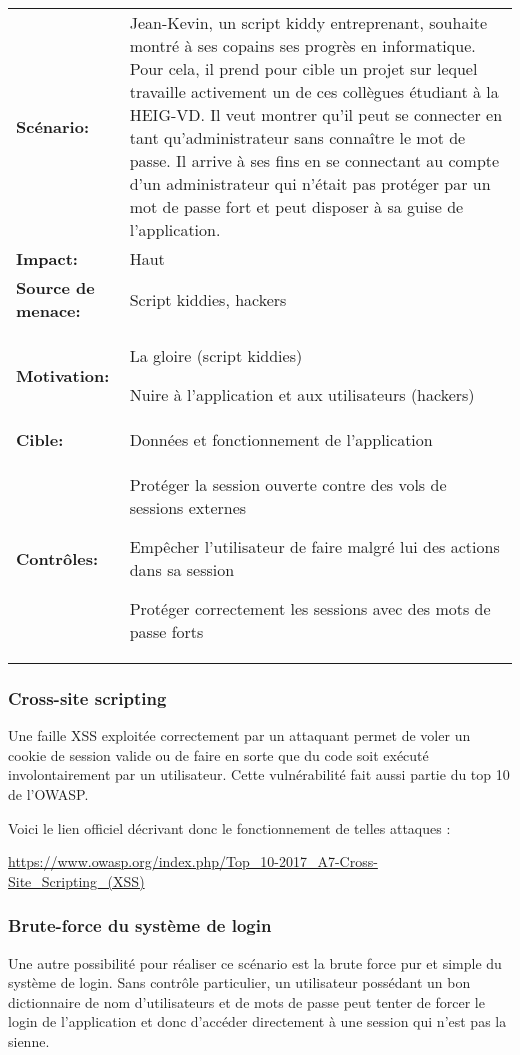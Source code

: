 \renewcommand{\arraystretch}{1.6}
\begin{tabular}{@{}p{4cm}p{12cm}}
\textbf{Scénario:} &  Jean-Kevin, un script kiddy entreprenant, souhaite montré à ses copains ses progrès en informatique. Pour cela, il prend pour cible un projet sur lequel travaille activement un de ces collègues étudiant à la HEIG-VD. Il veut montrer qu'il peut se connecter en tant qu'administrateur sans connaître le
mot de passe. Il arrive à ses fins en se connectant au compte d'un
administrateur qui n'était pas protéger par un mot de passe fort et
peut disposer à sa guise de l'application.\\
\textbf{Impact:} & Haut \\
\textbf{Source de menace: } & Script kiddies, hackers \\
\textbf{Motivation:} & La gloire (script kiddies)

Nuire à l'application et aux utilisateurs (hackers)\\
\textbf{Cible:} & Données et fonctionnement de l'application \\
\textbf{Contrôles:} & Protéger la session ouverte contre des vols de sessions externes

Empêcher l'utilisateur de faire malgré lui des actions dans sa session

Protéger correctement les sessions avec des mots de passe forts
\end{tabular}
\renewcommand{\arraystretch}{1}

\subsubsection{Cross-site scripting}

Une faille XSS exploitée correctement par un attaquant permet de voler un cookie de session valide ou de faire en sorte que du code soit exécuté involontairement par un utilisateur. Cette vulnérabilité fait aussi partie du top 10 de l'OWASP.

Voici le lien officiel décrivant donc le fonctionnement de telles attaques :

\url{https://www.owasp.org/index.php/Top_10-2017_A7-Cross-Site_Scripting_(XSS)}

\subsubsection{Brute-force du système de login}

Une autre possibilité pour réaliser ce scénario est la brute force pur et simple du système de login. Sans contrôle particulier, un utilisateur possédant un bon dictionnaire de nom d'utilisateurs et de mots de
passe peut tenter de forcer le login de l'application et donc d'accéder directement à une session qui n'est pas la sienne.

